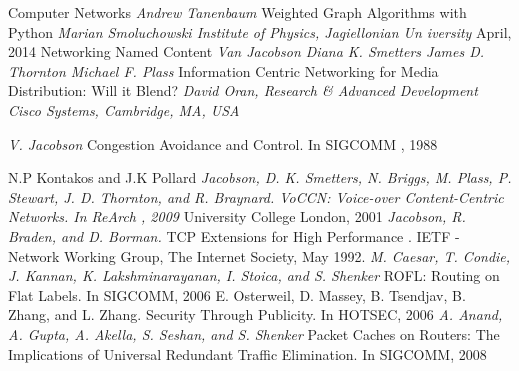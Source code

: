 \documentclass[11pt, oneside]{Thesis} %
\begin{document}
\begin{thebibliography}{9}

Computer Networks
\textit{Andrew Tanenbaum}%
Weighted Graph Algorithms with Python
\textit{Marian Smoluchowski Institute of Physics, Jagiellonian Un
iversity} April, 2014
%
Networking Named Content
\textit{Van Jacobson
Diana K. Smetters
James D. Thornton
Michael F. Plass}
%
Information Centric Networking for Media Distribution: 
Will it Blend?
\textit{David Oran, Research \& Advanced Development 
Cisco Systems, Cambridge, MA, USA}

\textit{V. Jacobson}
Congestion Avoidance and Control. In
SIGCOMM
, 1988



N.P Kontakos and J.K Pollard
\textit{ Jacobson, D. K. Smetters, N. Briggs, M. Plass, P. Stewart, J. D. Thornton, and R. Braynard. VoCCN: Voice-over Content-Centric Networks. In ReArch
, 2009} University College London, 2001
%
\textit{ Jacobson, R. Braden, and D. Borman.}
TCP Extensions for High Performance . IETF - Network Working Group, The Internet Society, May 1992.
\textit{M. Caesar, T. Condie, J. Kannan, K. Lakshminarayanan, I. Stoica, and S. Shenker}
ROFL: Routing on Flat Labels. In SIGCOMM, 2006%
E. Osterweil, D. Massey, B. Tsendjav, B. Zhang, and
L. Zhang. Security Through Publicity. In
HOTSEC, 2006
\textit{A. Anand, A. Gupta, A. Akella, S. Seshan, and S. Shenker} Packet Caches on Routers: The Implications of Universal Redundant Traffic Elimination. In
SIGCOMM, 2008

%
%


\end{thebibliography}
\end{document}
